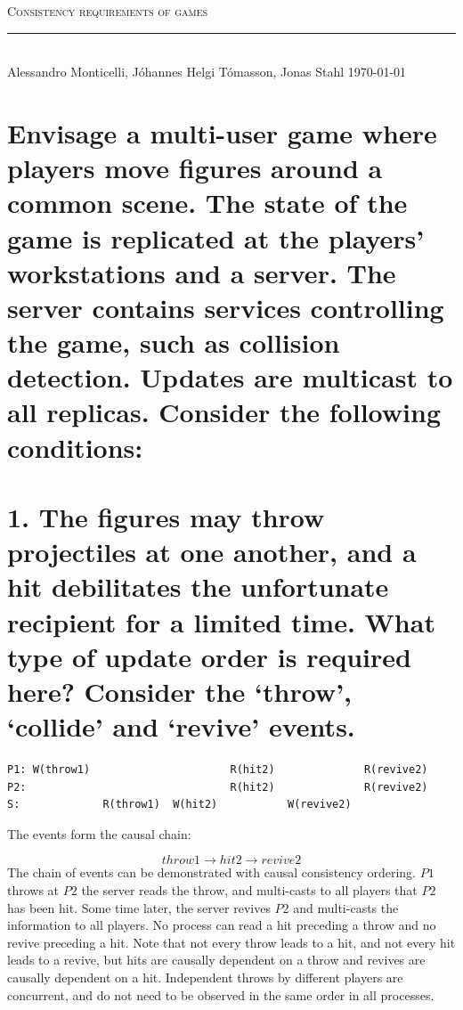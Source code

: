 \documentclass[a4paper,11pt]{article}
\newcommand{\linia}{\rule{\linewidth}{0.5pt}}
\begin{document}
\begin{center}
\vspace{2ex}
{\huge \textsc{Consistency requirements of games}}
\vspace{1ex}
\\
\linia\\
Alessandro Monticelli, Jóhannes Helgi Tómasson, Jonas Stahl \hfill \today %
\vspace{4ex}
\end{center}

\section*{Envisage a multi-user game where players move figures around a common scene. The state of the game is replicated at the players’ workstations and a server. The server contains services controlling the game, such as collision detection. Updates are multicast to all replicas. Consider the following conditions:}

\section*{1. The figures may throw projectiles at one another, and a hit debilitates the unfortunate recipient for a limited time. What type of update order is required here? Consider the ‘throw’, ‘collide’ and ‘revive’ events.}
\begin{lstlisting}[caption=Causal ordering of actions as seen by server and clients]
P1: W(throw1)                      R(hit2)              R(revive2)
P2:                                R(hit2)              R(revive2)
S:             R(throw1)  W(hit2)           W(revive2)
\end{lstlisting}
The events form the causal chain:

\[
throw1 \rightarrow hit2 \rightarrow revive2
\]
The chain of events can be demonstrated with causal consistency ordering. $P1$ throws at $P2$ the server reads the throw, and multi-casts to all players that $P2$ has been hit. Some time later, the server revives $P2$ and multi-casts the information to all players. No process can read a hit preceding a throw and no revive preceding a hit. Note that not every throw leads to a hit, and not every hit leads to a revive, but hits are causally dependent on a throw and revives are causally dependent on a hit.
Independent throws by different players are concurrent, and do not need to be observed in the same order in all processes.
\end{document}
